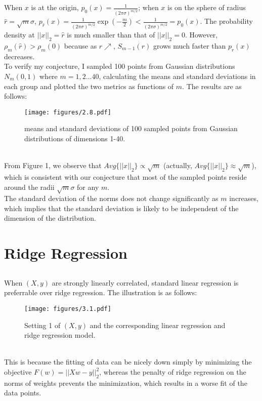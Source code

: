 \documentclass{article}
\begin{document}
        \subsection{}
        When $x$ is at the origin, $p_0(x)=\frac{1}{(2\pi\sigma)^{m/2}}$; when $x$ is on the sphere of radius $\hat{r}=\sqrt{m}\sigma$, $p_{\hat{r}}(x)=\frac{1}{(2\pi\sigma)^{m/2}}\exp(-\frac{m}{2})<\frac{1}{(2\pi\sigma)^{m/2}}=p_0(x)$.
        The probability density at $||x||_2=\hat{r}$ is much smaller than that of $||x||_2=0$. However, $\rho_m(\hat{r})>\rho_m(0)$ because as $r\nearrow$, $S_{m-1}(r)$ grows much faster than $p_r(x)$ decreases.\\
        To verify my conjecture, I sampled 100 points from Gaussian distributions $N_m(0, 1)$ where $m=1,2\dots40$,
        calculating the means and standard deviations in each group and plotted the two metrics as functions of $m$. The results are as follows:
        \begin{figure}
            \centering
            \texttt{[image: figures/2.8.pdf]}
            \caption{means and standard deviations of 100 sampled points from Gaussian distributions of dimensions 1-40.}
        \end{figure}\\
        \noindent From Figure 1, we observe that $Avg\{||x||_2\}\propto\sqrt{m}$ (actually, $Avg\{||x||_2\}\approx\sqrt{m}$), 
        which is consistent with our conjecture that most of the sampled points reside around the radii $\sqrt{m}\sigma$ for any $m$. \\
        The standard deviation of the norms does not change significantly as $m$ increases, which implies that the standard deviation is likely to be independent of the dimension of the distribution.

    \section{Ridge Regression}

        \subsection{}
        When $(X, y)$ are strongly linearly correlated, standard linear regression is preferrable over ridge regression. 
        The illustration is as follows:
        \vspace{-10pt}
        \begin{figure}[hbt!]
            \centering
            \texttt{[image: figures/3.1.pdf]}
            \caption{Setting 1 of $(X, y)$ and the corresponding linear regression and ridge regression model.}
        \end{figure}\\
        This is because the fitting of data can be nicely down simply by minimizing the objective $F(w)=||Xw-y||_2^2$, 
        whereas the penalty of ridge regression on the norms of weights prevents the minimization, 
        which results in a worse fit of the data points.
\end{document}
